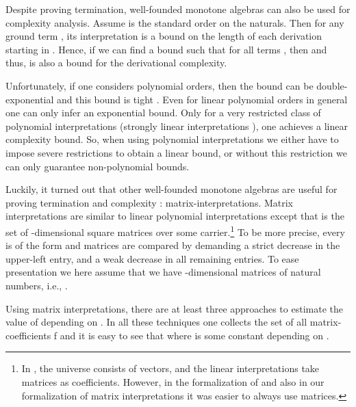 \documentclass[a4paper]{llncs}
\begin{document}
Despite proving termination, well-founded monotone algebras can also be used
for complexity analysis. Assume  is the standard order on the naturals.
Then for any ground term , its interpretation  is a bound on
the length of each derivation starting in . Hence, 
if we can find a bound  such that 
for all terms ,
then  and thus,  is also a bound for the derivational
complexity.

Unfortunately, if one considers polynomial orders, then the bound  can be double-exponential and this bound is tight \cite{HL89}.
Even for linear polynomial orders in general one can only infer an exponential
bound. Only for a very restricted class of polynomial interpretations 
(strongly linear interpretations \cite{Bon01}), one achieves a linear complexity bound.
So, when using polynomial interpretations we either have to impose severe restrictions to obtain a linear bound, or
without this restriction we can only guarantee non-polynomial bounds.

Luckily, it turned out that other well-founded monotone algebras are useful for
proving termination \cite{MatrixJAR} and complexity \cite{MSW08}: matrix-interpretations. Matrix interpretations
are similar to linear polynomial interpretations except that  is the
set of -dimensional square matrices over some carrier.\footnote{In
\cite{MatrixJAR}, the universe consists of vectors, and the linear 
interpretations
take matrices as coefficients. 
However, in the formalization of \cite{SOFSEM10} and also in our
formalization of matrix interpretations it was easier to always use matrices.} 
To be more precise, every  is of the form  and matrices are compared 
by demanding a strict decrease in the upper-left entry, and a weak decrease
in all remaining entries.
To ease presentation
we here assume that we have -dimensional matrices of natural numbers,
i.e., .

Using matrix interpretations, there are at least three approaches to estimate
the value of  depending on .
In all these techniques one collects the set of all matrix-coefficients 
f
and it is easy to see that  where  is some constant depending on .
\end{document}
